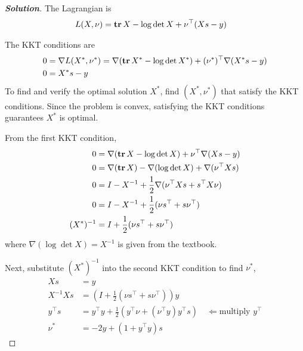 \documentclass[11pt]{article}
\newenvironment{solution}
  {\renewcommand\qedsymbol{$\square$}\begin{proof}[\textbf{Solution}]}
  {\end{proof}}
\newcommand{\grad}{\nabla}
\newcommand{\inv}{^{-1}}        %
\begin{document}
\begin{solution}
The Lagrangian is
\begin{align*}
  L(X, \nu) &= \mathop{\textbf{tr}} X - \log\det X + \nu^\top (Xs - y)
\end{align*}


The KKT conditions are 
\begin{align*}
  0 &= \grad L(X^*, \nu^*) = \nabla (\Tr X^* - \log \det X^*) + (\nu^*)^\top \nabla (X^*s - y)\\
  0 &= X^*s - y
\end{align*}
To find and verify the optimal solution $X^*$, find $(X^*, \nu^*)$ that satisfy the KKT conditions. Since the problem is convex, satisfying the KKT conditions guarantees $X^*$ is optimal. 

From the first KKT condition,
\begin{align*}
    0 &= \nabla (\Tr X - \log \det X) + \nu^\top \nabla (Xs - y) \\
    0 &= \nabla (\Tr X) - \nabla (\log \det X) + \nabla (\nu^\top X s) \\
    0 &= I - X^{-1} + \frac{1}{2} \nabla (\nu^\top X s + s^\top X \nu) \\
    0 &= I - X^{-1} + \frac{1}{2} (\nu s^\top + s \nu^\top) \\
    (X^*)\inv &= I + \frac{1}{2} (\nu s^\top + s \nu^\top)
\end{align*}
where $\nabla (\log \det X) = X^{-1}$ is given from the textbook.

Next, substitute $(X^*)\inv$ into the second KKT condition to find $\nu^*$,
\begin{align*}
    Xs &= y \\
    X^{-1} X s &= (I + \frac{1}{2} (\nu s^\top + s \nu^\top)) y \\
    y^\top s &= y^\top y + \frac{1}{2} (y^\top \nu + (\nu^\top y) y^\top s)  \quad \Leftarrow\text{multiply }y^\top\\
    \nu^* &= -2y + (1 + y^\top y) s
\end{align*}


\end{solution}
\end{document}
